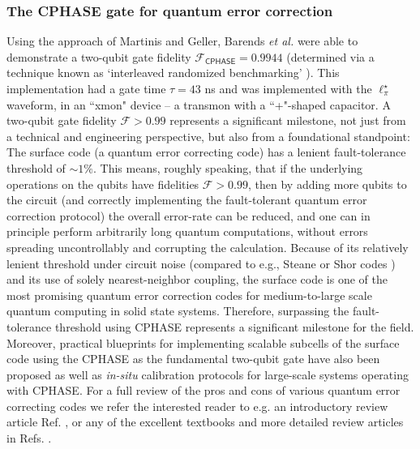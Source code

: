 \documentclass[aip,apr,twocolumn,showpacs,superscriptaddress,groupedaddress,nofootinbib,reprint]{revtex4-1}  %
\newcommand{\CPHASE}{\textsf{CPHASE}}
\newcommand{\etal}{\emph{et al.}}
\begin{document}
\subsubsection{The \CPHASE{} gate for quantum error correction}\label{subsubsec:CZforQEC}
Using the approach of Martinis and Geller, Barends \etal{} were able to demonstrate a two-qubit gate fidelity $\mathcal F_\CPHASE{} = 0.9944$ (determined via a technique known as `interleaved randomized benchmarking' \cite{Benhelm2008,Ryan2009,Magesan2011,Corcoles2013}). This implementation had a gate time $\tau = 43$ ns and was implemented with the $\ell^\star_\pi$ waveform\cite{Barends2014}, in an ``xmon" device \cite{Barends2013} -- a transmon with a ``+"-shaped capacitor. A two-qubit gate fidelity $\mathcal F >0.99$ represents a significant milestone, not just from a technical and engineering perspective, but also from a foundational standpoint: The surface code (a quantum error correcting code) has a lenient fault-tolerance threshold of $\sim 1\%$\cite{Fowler2012,Fowler2012,Tomita2014,OBrien2017}. This means, roughly speaking, that if the underlying operations on the qubits have fidelities $\mathcal F>0.99$, then by adding more qubits to the circuit (and correctly implementing the fault-tolerant quantum error correction protocol) the overall error-rate can be reduced, and one can in principle perform arbitrarily long quantum computations, without errors spreading uncontrollably and corrupting the calculation. Because of its relatively lenient threshold under circuit noise (compared to e.g., Steane or Shor codes \cite{NielsenChuang,Nickerson2016,Campbell2017a}) and its use of solely nearest-neighbor coupling, the surface code is one of the most promising quantum error correction codes for medium-to-large scale quantum computing in solid state systems\cite{Fowler2012}. Therefore, surpassing the fault-tolerance threshold using \CPHASE{} represents a significant milestone for the field\cite{Benjamin2015}. Moreover, practical blueprints for implementing scalable subcells of the surface code using the \CPHASE{} as the fundamental two-qubit gate have also been proposed \cite{Versluis2017} as well as \emph{in-situ} calibration protocols for large-scale systems operating with \CPHASE\cite{Kelly2016}. For a full review of the pros and cons of various quantum error correcting codes we refer the interested reader to e.g. an introductory review article Ref. , or any of the excellent textbooks and more detailed review articles in Refs. .
\end{document}
